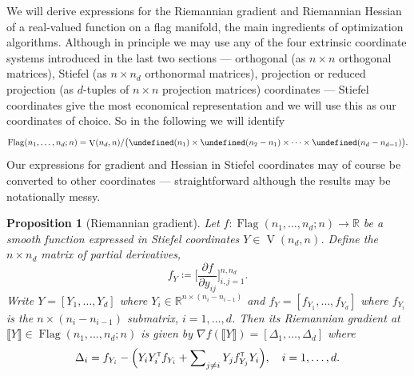 \documentclass[11pt,reqno]{amsart}%
\newtheorem{proposition}[theorem]{Proposition}
\theoremstyle{definition}
\theoremstyle{remark}
\newcommand{\tp}{{\scriptscriptstyle\mathsf{T}}}
\newcommand{\lb}{\llbracket}
\newcommand{\rb}{\rrbracket}
\let\O\undefined
\DeclareMathOperator{\V}{V}
\DeclareMathOperator{\Flag}{Flag}
\DeclareMathOperator{\O}{O}
\begin{document}
We will derive expressions for the Riemannian gradient and Riemannian Hessian of a real-valued function on a flag manifold, the main ingredients of optimization algorithms.  Although in principle we may use any of the four extrinsic coordinate systems introduced in the last two sections --- orthogonal (as $n \times n$ orthogonal matrices), Stiefel (as $n \times n_d$ orthonormal matrices), projection or reduced projection (as $d$-tuples of $n \times n$ projection matrices) coordinates ---  Stiefel coordinates give  the most economical representation and we will use this as our coordinates of choice. So in the following we will identify
\begin{equation}\label{eq:identify}
\Flag(n_1,\dots,n_d;n) = \V(n_d,n) / \bigl(\O(n_1) \times \O(n_2-n_1) \times \dots \times \O(n_d- n_{d-1})\bigr).
\end{equation}
Our expressions for gradient and Hessian in Stiefel coordinates may of course be converted to other coordinates --- straightforward although the results may be notationally messy.
\begin{proposition}[Riemannian gradient]\label{prop:gradient}
Let $f:\Flag(n_1,\dots,n_d;n) \to \mathbb{R}$ be a smooth function expressed in Stiefel coordinates $Y \in \V(n_d, n)$. Define the $n\times n_d$ matrix of partial derivatives,
\begin{equation}\label{eq:fY}
f_Y \coloneqq \biggl[  \frac{\partial f}{\partial y_{ij}} \biggr]_{i,j=1}^{n,n_d}.
\end{equation}
Write $Y = [Y_1,\dots, Y_d]$ where $Y_i\in \mathbb{R}^{n\times (n_i-n_{i-1})}$ and $f_Y = [f_{Y_1},\dots, f_{Y_d}]$ where $f_{Y_i}$ is the $n\times (n_i-n_{i-1})$ submatrix, $i=1,\dots, d$. Then its Riemannian gradient at $\lb Y \rb \in \Flag(n_1,\dots,n_d;n) $ is given by $\nabla f(\lb Y \rb) = [\Delta_1, \dots, \Delta_d]$ where
\begin{equation}\label{eq:gradient variable delta}
\Delta_i = f_{Y_i} - \Bigl(Y_i Y_i^\tp  f_{Y_i} + \sum\nolimits_{j\ne i } Y_j f_{Y_j}^\tp  Y_i\Bigr), \quad i=1,\dots,d.
\end{equation}
\end{proposition}
\end{document}
